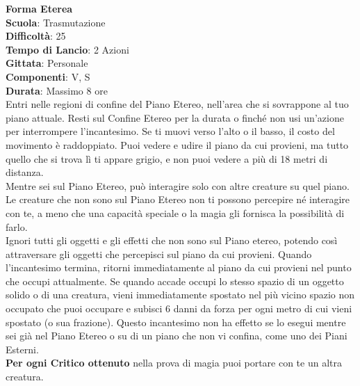 \begin{multicols}{2}
\medskip\textbf{Forma Eterea}\\
\textbf{Scuola}: Trasmutazione\\
\textbf{Difficoltà}:  25\\
\textbf{Tempo di Lancio}: 2 Azioni\\
\textbf{Gittata}: Personale\\
\textbf{Componenti}: V, S\\
\textbf{Durata}: Massimo 8 ore\\
Entri nelle regioni di confine del Piano Etereo, nell'area che si sovrappone al tuo piano attuale. Resti sul Confine Etereo per la durata o finché non usi un'azione per interrompere l'incantesimo. Se ti muovi verso l’alto o il basso, il costo del movimento è raddoppiato. Puoi vedere e udire il piano da cui provieni, ma tutto quello che si trova lì ti appare grigio, e non puoi vedere a più di 18 metri di distanza.\\
Mentre sei sul Piano Etereo, può interagire solo con altre creature su quel piano. Le creature che non sono sul Piano Etereo non ti possono percepire né interagire con te, a meno che una capacità speciale o la magia gli fornisca la possibilità di farlo.\\
Ignori tutti gli oggetti e gli effetti che non sono sul Piano etereo, potendo così attraversare gli  oggetti che percepisci sul piano da cui provieni. Quando l'incantesimo termina, ritorni immediatamente al piano da cui provieni nel punto che occupi attualmente. Se quando accade occupi lo stesso spazio di un oggetto solido o di una creatura, vieni immediatamente spostato nel più vicino spazio non occupato che puoi occupare e subisci 6 danni da forza per ogni metro di cui vieni spostato (o sua frazione). Questo incantesimo non ha effetto se lo esegui mentre sei già nel Piano Etereo o su di un piano che non vi confina, come uno dei Piani Esterni.\\
\textbf{Per ogni Critico ottenuto} nella prova di magia puoi portare con te un altra creatura.


\end{multicols}
